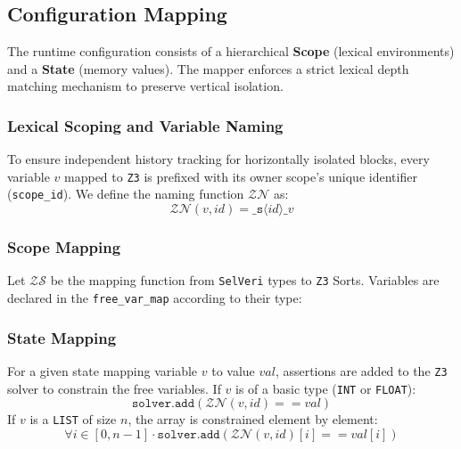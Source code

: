 \documentclass{article}
\begin{document}
\newpage
\subsection{Configuration Mapping}
The runtime configuration consists of a hierarchical \textbf{Scope} (lexical environments) and a \textbf{State} (memory values). The mapper enforces a strict lexical depth matching mechanism to preserve vertical isolation.

\subsubsection{Lexical Scoping and Variable Naming}
To ensure independent history tracking for horizontally isolated blocks, every variable $v$ mapped to \texttt{Z3} is prefixed with its owner scope's unique identifier (\texttt{scope\_id}). We define the naming function $\mathcal{ZN}$ as:
\[
\mathcal{ZN}(v, id) = \texttt{\_s}\langle id \rangle\texttt{\_}v
\]


\subsubsection{Scope Mapping}
Let $\mathcal{ZS}$ be the mapping function from \texttt{SelVeri} types to \texttt{Z3} Sorts. Variables are declared in the \texttt{free\_var\_map} according to their type:

\begin{table}[h!]
\centering
\renewcommand{\arraystretch}{1.5} 
\end{table}

\subsubsection{State Mapping}
For a given state mapping variable $v$ to value $val$, assertions are added to the \texttt{Z3} solver to constrain the free variables. 
If $v$ is of a basic type (\texttt{INT} or \texttt{FLOAT}):
\[
\texttt{solver.add}( \mathcal{ZN}(v, id) == val )
\]
If $v$ is a \texttt{LIST} of size $n$, the array is constrained element by element:
\[
\forall i \in [0, n-1] \cdot \texttt{solver.add}( \mathcal{ZN}(v, id)[i] == val[i] )
\]
\end{document}
